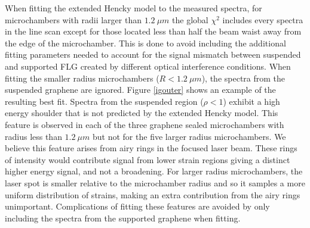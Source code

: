 When fitting the extended Hencky model to the measured spectra, for microchambers with radii larger than $1.2 \ \mu m$ the global $\chi^2$ includes every spectra in the line scan except for those located less than half the beam waist away from the edge of the microchamber.  This is done to avoid including the additional fitting parameters needed to account for the signal mismatch between suspended and supported FLG created by different optical interference conditions.  When fitting the smaller radius microchambers ($R<1.2 \ \mu m$), the spectra from the suspended graphene are ignored. Figure \ref{igouter} shows an example of the resulting best fit.  Spectra from the suspended region ($\rho<1$) exhibit a high energy shoulder that is not predicted by the extended Hencky model.  This feature is observed in each of the three graphene sealed microchambers with radius less than $1.2 \ \mu m$ but not for the five larger radius microchambers.  We believe this feature arises from airy rings in the focused laser beam.  These rings of intensity would contribute signal from lower strain regions giving a distinct higher energy signal, and not a broadening.  For larger radius microchambers, the laser spot is smaller relative to the microchamber radius and so it samples a more uniform distribution of strains, making an extra contribution from the airy rings unimportant. Complications of fitting these features are avoided by only including the spectra from the supported graphene when fitting.  

